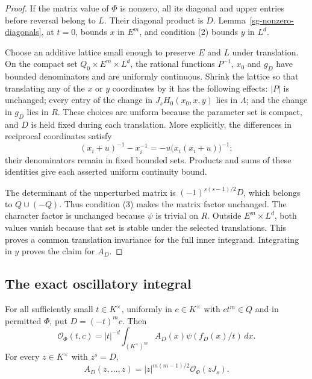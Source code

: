 \begin{proof}
If the matrix value of $\Phi$ is nonzero, all its diagonal
and upper entries before reversal belong to $L$.  Their
diagonal product is $D$.  Lemma~\ref{sg-nonzero-diagonals},
at $t=0$, bounds $x$ in $E^m$, and condition (2) bounds $y$
in $L^d$.

Choose an additive lattice small enough to preserve $E$ and
$L$ under translation.  On the compact set
$Q_0\times E^m\times L^d$, the rational functions $P^{-1}$,
$x_0$ and $g_D$ have bounded denominators and are uniformly
continuous.  Shrink the lattice so that translating any of
the $x$ or $y$ coordinates by it has the following effects:
$|P|$ is unchanged; every entry of the change in
$J_sH_0(x_0,x,y)$ lies in $\Lambda$; and the change in
$g_D$ lies in $R$.  These choices are uniform because the
parameter set is compact, and $D$ is held fixed during each
translation.  More explicitly, the differences in reciprocal
coordinates satisfy
\[
 (x_i+u)^{-1}-x_i^{-1}=-u\bigl(x_i(x_i+u)\bigr)^{-1};
\]
their denominators remain in fixed bounded sets.  Products
and sums of these identities give each asserted uniform
continuity bound.

The determinant of the unperturbed matrix is
$(-1)^{s(s-1)/2}D$, which belongs to $Q\cup(-Q)$.
Thus condition (3) makes the matrix factor unchanged.
The character factor is unchanged because $\psi$ is trivial
on $R$.  Outside $E^m\times L^d$, both values vanish because
that set is stable under the selected translations.  This
proves a common translation invariance for the full inner
integrand.  Integrating in $y$ proves the claim for $A_D$.
\end{proof}

\subsection{The exact oscillatory integral}

\begin{theorem}\label{sg-oscillatory-reduction}
For all sufficiently small $t\in K^\times$, uniformly in
$c\in K^\times$ with $ct^m\in Q$ and in permitted $\Phi$,
put $D=(-t)^mc$.  Then
\begin{equation}\label{sg-oscillatory-identity}
 \mathcal O_\Phi(t,c)
   =|t|^{-d}\int_{(K^\times)^m}
                         A_D(x)\psi(f_D(x)/t)\,dx.
\end{equation}
For every $z\in K^\times$ with $z^s=D$,
\begin{equation}\label{sg-critical-amplitude}
 A_D(z,\ldots,z)
       =|z|^{m(m-1)/2}\mathcal O_\Phi(zJ_s).
\end{equation}
\end{theorem}


